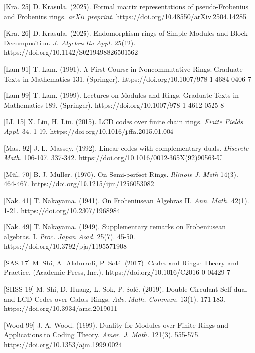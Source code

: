 \documentclass{article}
\theoremstyle{plain}
\theoremstyle{plain}
\theoremstyle{remark}
\theoremstyle{plain}
\begin{document}
[Kra. 25] D. Krasula. (2025). Formal matrix representations of pseudo-Frobenius and Frobenius rings. \textit{arXiv preprint}. https://doi.org/10.48550/arXiv.2504.14285

[Kra. 26] D. Krasula. (2026). Endomorphism rings of Simple Modules and Block Decomposition. \textit{J. Algebra Its Appl.} 25(12).  https://doi.org/10.1142/S0219498826501562

[Lam 91] T. Lam. (1991). A First Course in Noncommutative Rings.  Graduate Texts in Mathematics 131. (Springer). https://doi.org/10.1007/978-1-4684-0406-7

[Lam 99]  T. Lam. (1999). Lectures on Modules and Rings.  Graduate Texts in Mathematics 189. (Springer). https://doi.org/10.1007/978-1-4612-0525-8

[LL 15] X. Liu, H. Liu. (2015). LCD codes over finite chain rings. \textit{Finite Fields Appl.} 34. 1-19. https://doi.org/10.1016/j.ffa.2015.01.004

[Mas. 92] J. L. Massey. (1992). Linear codes with complementary duals. \textit{Discrete Math.} 106-107. 337-342. https://doi.org/10.1016/0012-365X(92)90563-U

[Mül. 70] B. J. Müller. (1970). On Semi-perfect Rings.  \textit{Illinois J. Math} 14(3). 464-467. https://doi.org/10.1215/ijm/1256053082


[Nak. 41] T. Nakayama. (1941). On Frobeniusean Algebras II. \textit{Ann. Math.} 42(1). 1-21. https://doi.org/10.2307/1968984


[Nak. 49] T. Nakayama. (1949). Supplementary remarks on Frobeniusean algebras. I. \textit{Proc. Japan Acad.} 25(7). 45-50. https://doi.org/10.3792/pja/1195571908



[SAS 17] M. Shi, A. Alahmadi, P. Solé. (2017). Codes and Rings: Theory and Practice. (Academic Press, Inc.). https://doi.org/10.1016/C2016-0-04429-7

[SHSS 19] M. Shi, D. Huang, L. Sok, P. Solé. (2019). Double Circulant Self-dual and LCD Codes over Galois Rings. \textit{Adv. Math. Commun.} 13(1). 171-183. https://doi.org/10.3934/amc.2019011

[Wood 99] J. A. Wood. (1999). Duality for Modules over Finite Rings and Applications to Coding Theory. \textit{Amer. J. Math.} 121(3). 555-575. https://doi.org/10.1353/ajm.1999.0024
\end{document}
